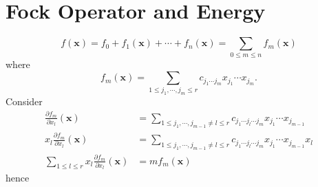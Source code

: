 \documentclass[aps,preprint]{revtex4}%
\begin{document}
\section{Fock Operator and Energy}%

\begin{equation}
f\left(  \mathbf{x}\right)  =f_{0}+f_{1}\left(  \mathbf{x}\right)
+\cdots+f_{n}\left(  \mathbf{x}\right)  =%
{\textstyle\sum\limits_{0\leq m\leq n}}
f_{m}\left(  \mathbf{x}\right)
\end{equation}
where
\begin{equation}
f_{m}\left(  \mathbf{x}\right)  =%
{\textstyle\sum\limits_{1\leq j_{1},\cdots,j_{m}\leq r}}
c_{j_{1}\cdots j_{m}}x_{j_{1}}\cdots x_{j_{m}}.
\end{equation}
Consider
\begin{align}
\frac{\partial f_{m}}{\partial x_{l}}\left(  \mathbf{x}\right)    & =%
{\textstyle\sum\limits_{1\leq j_{1},\cdots,j_{m-1}\neq l\leq r}}
c_{j_{1}\cdots j_{l}\cdots j_{m}}x_{j_{1}}\cdots x_{j_{m-1}}\\
x_{l}\frac{\partial f_{m}}{\partial x_{l}}\left(  \mathbf{x}\right)    & =%
{\textstyle\sum\limits_{1\leq j_{1},\cdots,j_{m-1}\neq l\leq r}}
c_{j_{1}\cdots j_{l}\cdots j_{m}}x_{j_{1}}\cdots x_{j_{m-1}}x_{l}\\%
{\textstyle\sum\limits_{1\leq l\leq r}}
x_{l}\frac{\partial f_{m}}{\partial x_{l}}\left(  \mathbf{x}\right)    &
=mf_{m}\left(  \mathbf{x}\right)
\end{align}
hence%
\end{document}
